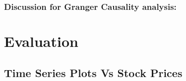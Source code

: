 \documentclass[sigconf, nonacm]{acmart}
\begin{document}
\subsubsection{Discussion for Granger Causality analysis:}



\section{Evaluation}
\subsection{Time Series Plots Vs Stock Prices} 

\end{document}
